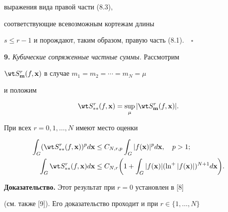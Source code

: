 выражения вида правой части (8.3),


соответствующие всевозможным кортежам длины


$s\le r{-}1$ и порождают, таким образом, правую часть (8.1).$\quad\square$


\medskip





\addtocounter{section}{1}


\setcounter{equation}{0}


\setcounter{lems}{0}


\setcounter{thms}{0}





{\bf 9.} {\it Кубические сопряженные частные суммы.} Рассмотрим


$\wt S^r_{{\bold m}} (f,{\bold x})$ в случае $m_1=m_2=\dotsb=m_N=\mu$


и положим


$$


\wt S^r_{**} (f,{\bold x})=\sup_\mu|\wt S^r_{{\bold m}} (f,{\bold x})|.


$$








\begin{thms}


При всех $r=0,1,\dotsc,N$ имеют место оценки


\begin{align}


\int_G(\wt S^r_{**} (f,{\bold x}))^p d{\bold x}&\le C_{N,r,p}


\int_G |f ( {\bold x})|^p d{\bold x}, \quad p>1;\notag \\


%


\int_G \wt S^r_{**} (f,{\bold x}) d{\bold x}&\le C_{N,r}


\bigg(1+\int_G |f({\bold x})|(\ln^+ |f ( {\bold x})|)^{N+1}d{\bold x}\bigg).


\end{align}


\end{thms}





{\bf Доказательство.} Этот результат при $r=0$ установлен в [8]


(см. также [9]). Его доказательство проходит и при $r\in\{1,\dotsc,N\}$


